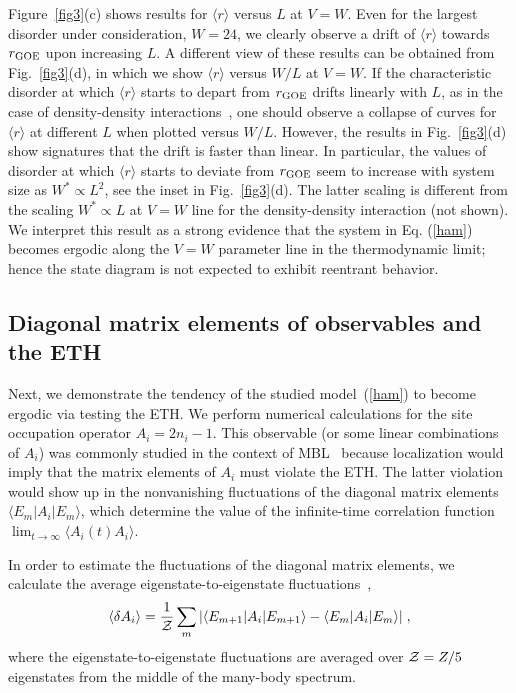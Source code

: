 \documentclass[twocolumn,pre,superscriptaddress,10pt,aps,floatfix]{revtex4-1}
\begin{document}
Figure~\ref{fig3}(c) shows results for $\langle r \rangle$ versus $L$ at $V=W$.
Even for the largest disorder under consideration, $W =24$, we clearly observe a drift of $\langle r  \rangle $ towards $r_{\rm GOE}$ upon increasing $L$.
A different view of these results can be obtained from Fig.~\ref{fig3}(d), in which we show $\langle r \rangle$ versus $W/L$ at $V=W$.
If the characteristic disorder at which $\langle r \rangle$ starts to depart from $r_{\rm GOE}$ drifts linearly with $L$, as in the case of density-density interactions~\cite{suntajs_2020}, one should observe a collapse of curves for $\langle r \rangle$ at different $L$ when plotted versus $W/L$.
However, the results in Fig.~\ref{fig3}(d) show signatures that the drift is faster than linear. In particular, the values of disorder at which
$\langle r  \rangle $ starts to deviate from $r_{\rm GOE}$ seem to increase with system size as $W^* \propto L^2$, see the inset in Fig.~\ref{fig3}(d). 
The latter scaling is different from the scaling $W^*\propto L$ at $V=W$ line for the density-density interaction (not shown).
We interpret this result as a strong evidence that the system in Eq. (\ref{ham})
 becomes ergodic along the $V=W$ parameter line in the thermodynamic limit; hence the state diagram is not expected to exhibit reentrant behavior.

\subsection{Diagonal matrix elements of observables and the ETH} \label{sec:ETH}

Next, we demonstrate the tendency of the studied model~(\ref{ham}) to become ergodic via testing the ETH. We perform numerical calculations for the site occupation operator $A_i=2n_i-1$.  This observable (or some linear combinations of $A_i$) was commonly studied in the context of MBL~\cite{mierzejewski2016,luitz16,sirker14,pal10} because localization would imply that the matrix elements of $A_i$ must violate the ETH. The latter violation would show up in the nonvanishing fluctuations of the diagonal matrix elements $\langle E_m| A_i |E_m \rangle $, which determine the value of the infinite-time correlation function $\lim_{t\to \infty} \langle A_i(t) A_i \rangle$. 

In order to estimate the fluctuations of the diagonal matrix elements, we calculate the average eigenstate-to-eigenstate fluctuations~\cite{Kim_strong2014, Mondaini2016, jansen_stolpp_19},
\begin{equation} \label{eefluct}
\langle \delta A_i \rangle= \frac{1}{\cal{Z}} \sum_{m} |\langle E_{m+1}| A_i |E_{m+1} \rangle -\langle E_m| A_i |E_m \rangle | \;,
\end{equation}
where the eigenstate-to-eigenstate fluctuations are averaged over ${\cal{Z}}=Z/5$ eigenstates from the middle of the many-body spectrum. 
\end{document}

